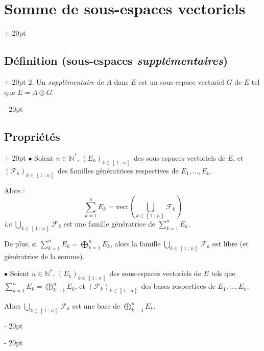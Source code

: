 \documentclass[a4paper, 12pt, twoside]{article}
\newcommand{\N}{\mathbb{N}} %
\newcommand{\nset}[2]{\left\llbracket #1\ ;\ #2 \right\rrbracket}
\newcommand{\lr}[1]{\left( #1 \right)}
\newcommand{\ind}[1][20pt]{\advance\leftskip + #1}
\newcommand{\deind}[1][20pt]{\advance\leftskip - #1}
\newenvironment{indt}[2][20pt]{#2 \par \ind[#1]}{\par \deind} %
\begin{document}
\begin{indt}{\section{Somme de sous-espaces vectoriels}}
\begin{indt}{\subsection{Définition (sous-espaces \textit{supplémentaires})}}
            2. Un \textit{supplémentaire} de $A$ dans $E$ est un sous-espace vectoriel $G$ de $E$ tel que $E = A \oplus G$.
        \end{indt}
        
        \vspace{12pt}
        
        \begin{indt}{\subsection{Propriétés}}
            $\bullet$ Soient $n \in \N^*$, $(E_k)_{k \in \nset 1 n}$ des sous-espaces vectoriels de $E$, et $(\mathcal F_k)_{k \in \nset 1 n}$ des familles génératrices respectives de $E_1, \ldots, E_n$.
            
            Alors : %
                \[ \sum_{k = 1}^n E_k = \mathrm{vect}\lr{\bigcup_{k \in \nset 1 n} \mathcal F_k} \]
            \textit{i.e} $\displaystyle \bigcup_{k \in \nset 1 n} \mathcal F_k$ est une famille génératrice de $\displaystyle \sum_{k = 1}^n E_k$.
            
            \vspace{12pt}
            
            De plus, si $\displaystyle \sum_{k = 1}^n E_k = \bigoplus_{k = 1}^n E_k$, alors la famille $\displaystyle \bigcup_{k \in \nset 1 n} \mathcal F_k$ est libre (et génératrice de la somme).
            
            
            \vspace{12pt}
            
            $\bullet$ Soient $n \in \N^*$, $(E_k)_{k \in \nset 1 n}$ des sous-espaces vectoriels de $E$ tels que $\displaystyle \sum_{k = 1}^n E_k = \bigoplus_{k = 1}^n E_k$, et $(\mathcal F_k)_{k \in \nset 1 n}$ des bases respectives de $E_1, \ldots, E_n$.
            
            \vspace{6pt}
            
            Alors $\displaystyle \bigcup_{k \in \nset 1 n} \mathcal F_k$ est une base de $\displaystyle \bigoplus_{k = 1}^n E_k$.
        \end{indt}
        
    \end{indt}
    
\end{document}
